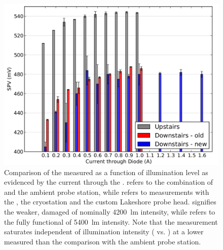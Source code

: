 \begin{figure}
\centering
	\includegraphics[width=0.8\linewidth]{./figs/currentseries}
	\caption{Comparison of the measured \spv{} as a function of illumination level as evidenced by the current through the \led{}.  refers to the combination of \led{} and the ambient probe station, while  refers to measurements with the \led{}, the \McA{} cryostation and the custom Lakeshore \kp{} probe head.  signifies the weaker, damaged \led{} of nominally \SI{4200}{\lumen} intensity, while  refers to the fully functional \led{} of \SI{5400}{\lumen} intensity. Note that the measurement saturates independent of illumination intensity ( vs. ) at a lower measured \spv{} than the comparison with the ambient probe station.}
	\label{fig:Iseries}
\end{figure}
